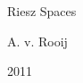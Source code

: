 \documentclass[main.tex]{subfiles}
\begin{document}
\vspace{5cm}
\begin{center}
{\Huge Riesz Spaces }
\end{center}
\vspace{1cm}
\begin{center}
{\LARGE A. v. Rooij}
\end{center}
\vspace{.5cm}
\begin{center}
{\Large 2011}
\end{center}
\newpage
\end{document}
